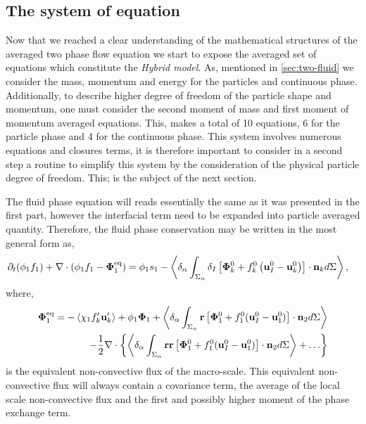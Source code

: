 \subsection{The system of equation}
Now that we reached a clear understanding of the mathematical structures of the averaged two phase flow equation we start to expose the averaged set of equations which constitute the \textit{Hybrid model}. 
As, mentioned in \ref{sec:two-fluid} we consider the mass, momentum and energy for the particles and continuous phase. 
Additionally, to describe higher degree of freedom of the particle shape and momentum, one must consider the second moment of mass and first moment of momentum averaged equations. 
This, makes a total of 10 equations, 6 for the particle phase and 4 for the continuous phase.
This system involves numerous equations and closures terms, it is therefore important to consider in a second step a routine to simplify this system by the consideration of the physical particle degree of freedom.
This; is the subject of the next section.    


The fluid phase equation will reads essentially the same as it was presented in the first part, however the interfacial term need to be expanded into particle averaged quantity. 
Therefore, the fluid phase conservation may be written in the most general form as, 
\begin{align}
    \partial_t (\phi_1 f_1)
    +\mathbf{\nabla}\cdot (\phi_1 f_1 - \bm\Phi_1^\text{eq})
    &= 
    \phi_1 s_1
    - \left<\delta_\alpha \int_{\Sigma_\alpha} \delta_I\left[
        \mathbf{\Phi}_k^0
        + f_k^0
        \left(
            \textbf{u}_I^0
            - \textbf{u}_k^0
        \right)
    \right]
    \cdot \textbf{n}_k d\Sigma\right> ,
\end{align}
where, 
\begin{align}
    \bm\Phi_1^\text{eq}
    = 
    - \left<\chi_1 f_k' \textbf{u}_k'\right>
    + \phi_1 \bm\Phi_1
    + \left<\delta_\alpha \int_{\Sigma_\alpha} \textbf{r} \left[
        \mathbf{\Phi}_1^0
        + f_1^0 (\textbf{u}_I^0-\textbf{u}_1^0)
    \right]\cdot \textbf{n}_2 d\Sigma\right>\\
    - \frac{1}{2}\mathbf{\nabla}\cdot\left\{
        \left<\delta_\alpha \int_{\Sigma_\alpha} \textbf{rr} \left[
            \mathbf{\Phi}_1^0
            + f_1^0 (\textbf{u}_I^0-\textbf{u}_1^0)
            \right]\cdot \textbf{n}_2 d\Sigma\right>
            +\ldots
        \right\}
\end{align}
is the equivalent non-convective flux of the macro-scale. 
This equivalent non-convective flux will always contain a covariance term, the average of the local scale non-convective flux and the first and possibly higher moment of the phase exchange term. 

